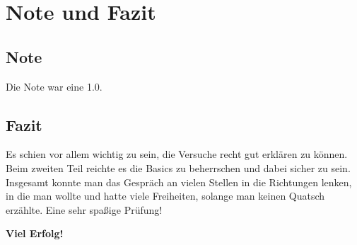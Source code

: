 \section{Note und Fazit}

\subsection{Note}

Die Note war eine \num{1.0}.

\subsection{Fazit}

Es schien vor allem wichtig zu sein, die Versuche recht gut erklären zu können. Beim zweiten Teil reichte es die Basics zu beherrschen und dabei sicher zu sein. Insgesamt konnte man das Gespräch an vielen Stellen in die Richtungen lenken, in die man wollte und hatte viele Freiheiten, solange man keinen Quatsch erzählte. Eine sehr spaßige Prüfung! 

\noindent \textbf{Viel Erfolg!} 
